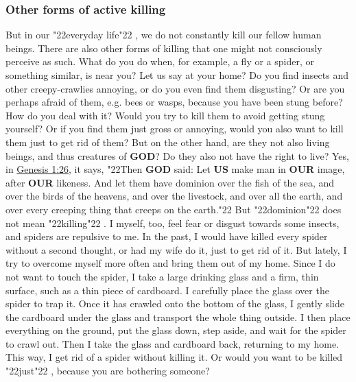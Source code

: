 \documentclass[10pt,a5paper]{article}
\newcommand{\God}[0]{\textbf{GOD}}
\newcommand{\Our}[0]{\textbf{OUR}}
\newcommand{\Us}[0]{\textbf{US}}
\newcommand{\q}[1]{\char"22{#1}\char"22 }
\begin{document}
	\subsubsection{Other forms of active killing}
		But in our \q{everyday life},
		we do not constantly kill our fellow human beings.
		There are also other forms of killing that one might not consciously perceive as such.
		What do you do when,
		for example,
		a fly or a spider,
		or something similar,
		is near you?
		Let us say at your home?
		Do you find insects and other creepy-crawlies annoying,
		or do you even find them disgusting?
		Or are you perhaps afraid of them,
		e.g. bees or wasps,
		because you have been stung before?
		How do you deal with it?
		Would you try to kill them to avoid getting stung yourself?
		Or if you find them just gross or annoying,
		would you also want to kill them just to get rid of them?
		But on the other hand,
		are they not also living beings,
		and thus creatures of {\God}?
		Do they also not have the right to live?
		Yes, in \href{https://www.die-bibel.de/bibeln/online-bibeln/lesen/ESV/GEN.1/Genesis-1}{Genesis 1:26},
		it says, 
		\q{Then {\God} said:
		Let {\Us} make man in {\Our} image,
		after {\Our} likeness.
		And let them have dominion over the fish of the sea,
		and over the birds of the heavens,
		and over the livestock,
		and over all the earth,
		and over every creeping thing that creeps on the earth.}
		But \q{dominion} does not mean \q{killing}.
		I myself,
		too,
		feel fear or disgust towards some insects,
		and spiders are repulsive to me.
		In the past,
		I would have killed every spider without a second thought,
		or had my wife do it,
		just to get rid of it.
		But lately,
		I try to overcome myself more often and bring them out of my home.
		Since I do not want to touch the spider,
		I take a large drinking glass and a firm,
		thin surface,
		such as a thin piece of cardboard.
		I carefully place the glass over the spider to trap it.
		Once it has crawled onto the bottom of the glass,
		I gently slide the cardboard under the glass and transport the whole thing outside.
		I then place everything on the ground,
		put the glass down,
		step aside,
		and wait for the spider to crawl out.
		Then I take the glass and cardboard back,
		returning to my home.
		This way,
		I get rid of a spider without killing it.
		Or would you want to be killed \q{just},
		because you are bothering someone?
\end{document}
